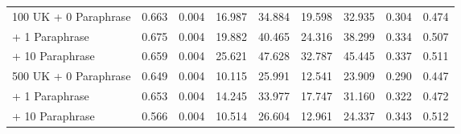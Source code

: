 \begin{table*}[!ht]
\begin{tabular}{l|cc|cccccc}
\hspace{0.5ex} 100 UK\hspace{1.2ex}  + \hspace{1.5ex} 0 Paraphrase    & 0.663                                 & 0.004                                & 16.987                            & 34.884                               & 19.598                               & 32.935                               & 0.304                                & 0.474                                \\
 \hspace{9.3ex} + \hspace{1.5ex} 1 Paraphrase  & 0.675                                 & 0.004                                & 19.882                            & 40.465                               & 24.316                               & 38.299                               & 0.334                                & 0.507                                \\
 \hspace{9.3ex} + \hspace{0.5ex} 10 Paraphrase  & 0.659                                 & 0.004                                & 25.621                            & 47.628                               & 32.787                               & 45.445                               & 0.337                                & 0.511                                \\
\hspace{0.5ex} 500 UK\hspace{1.2ex} + \hspace{1.5ex} 0 Paraphrase    & 0.649                                 & 0.004                                & 10.115                            & 25.991                               & 12.541                               & 23.909                               & 0.290                                & 0.447                                \\
 \hspace{9.3ex} + \hspace{1.5ex} 1 Paraphrase  &  0.653                                     &      0.004                                &      14.245                             &         33.977                             &                            17.747          &     31.160                                 &      0.322                                &       0.472                               \\
 \hspace{9.3ex} + \hspace{0.5ex} 10 Paraphrase  & 0.566                                 & 0.004                                & 10.514                            & 26.604                               & 12.961                               & 24.337                               & 0.343                                & 0.512                                \\

\end{tabular}
\end{table*}
